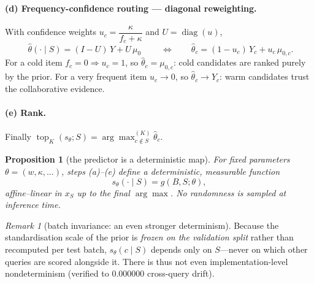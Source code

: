 \documentclass[11pt]{article}
\newtheorem{proposition}{Proposition}
\theoremstyle{remark}
\newtheorem{remark}{Remark}
\newcommand{\xs}{x_S}
\newcommand{\argmaxK}{\arg\max\nolimits^{(K)}}
\begin{document}
\paragraph{(d) Frequency-confidence routing --- diagonal reweighting.}
With confidence weights $u_c=\dfrac{\kappa}{f_c+\kappa}$ and $U=\operatorname{diag}(u)$,
\begin{equation}
  \boxed{\;\hat\theta(\cdot\mid S)=(I-U)\,Y+U\,\mu_0\;}
  \qquad\Longleftrightarrow\qquad
  \hat\theta_c=(1-u_c)\,Y_c+u_c\,\mu_{0,c}.
  \label{eq:route}
\end{equation}
For a cold item $f_c=0\Rightarrow u_c=1$, so $\hat\theta_c=\mu_{0,c}$: cold candidates are ranked purely by the
prior. For a very frequent item $u_c\to0$, so $\hat\theta_c\to Y_c$: warm candidates trust the collaborative
evidence.

\paragraph{(e) Rank.} Finally $\operatorname{top}_K(s_\theta;S)=\argmaxK_{c\notin S}\hat\theta_c$.

\begin{proposition}[the predictor is a deterministic map]
For fixed parameters $\theta=(w,\kappa,\dots)$, steps (a)--(e) define a deterministic, measurable function
\[
  s_\theta(\cdot\mid S)=g(B,S;\theta),
\]
affine--linear in $\xs$ up to the final $\arg\max$. No randomness is sampled at inference time.
\end{proposition}

\begin{remark}[batch invariance: an even stronger determinism]
Because the standardisation scale of the prior is \emph{frozen on the validation split} rather than recomputed per
test batch, $s_\theta(c\mid S)$ depends only on $S$---never on which other queries are scored alongside it. There is
thus not even implementation-level nondeterminism (verified to $0.000000$ cross-query drift).
\end{remark}
\end{document}
